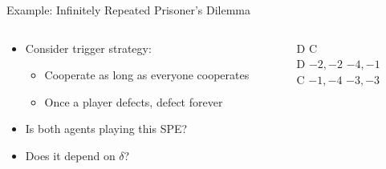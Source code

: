\documentclass[11pt,aspectratio=169]{beamer}
\begin{document}
  \begin{frame}{Example: Infinitely Repeated Prisoner's Dilemma} 
   \begin{columns}
    \begin{column}{0.7\textwidth}
     \begin{itemize}[<+->]
     \setlength{\itemsep}{1.2em}
      \item Consider \alert{trigger} strategy:
      \begin{itemize}[<.->]
       \item Cooperate as long as everyone cooperates
       \item Once a player defects, defect \alert{forever}
      \end{itemize}
      \item Is both agents playing this SPE?
      \item Does it depend on $\delta$?
     \end{itemize}
    \end{column}
    \begin{column}{0.3\textwidth}
     \begin{center}
      \begin{game}{2}{2}
      		\> D			\> C			\\
       D		\> $-2,-2$	\> $-4,-1$	\\
       C		\> $-1,-4$	\> $-3,-3$
      \end{game}
     \end{center}
    \end{column}
   \end{columns}
  \end{frame}
  
\end{document}
